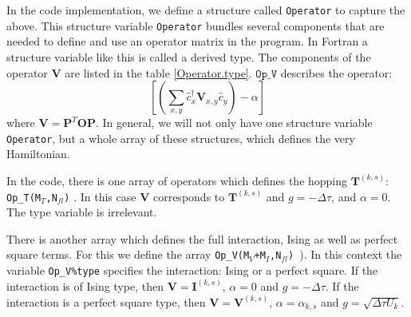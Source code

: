 In the code implementation, we define a structure called \texttt{Operator} to capture the above. 
This structure variable \texttt{Operator} bundles several components that are needed to define and use an operator matrix in the program.
In Fortran a structure variable like this is called a derived type. 
The components of the operator $\bm{V} $ are listed in  the table \ref{Operator.type}.   $ \texttt{Op\_V} $  describes the operator:
\begin{equation}
             \left[ \left( \sum_{x,y} \hat{c}^{\dagger}_x \bm{V}_{x,y} \hat{c}^{\phantom{\dagger}}_{y}  \right) - \alpha \right]  
\end{equation}
where $ \bm{V} = \bm{P}^{T} \bm{O} \bm{P}$.  In general, we will not only have one structure variable \texttt{Operator}, but a whole  array of these structures, which defines the very Hamiltonian. 

In the code, there is one array of operators which defines the hopping $\pmb{T}^{(k,s)} $:  \texttt{Op\_T(M$_T$,N$_{fl}$)} .  In this case $\bm{V}$ corresponds to $\bm{T}^{(k,s)}$ and $g=-\Delta \tau$, 
and $\alpha = 0$.  The type variable is irrelevant. 

  There is another array   which defines the full interaction,  Ising as well as perfect square terms. For this  we define  the array \texttt{Op\_V(M$_V$+M$_I$,N$_{fl}$) }). In this context the variable \texttt{Op\_V\%type} specifies the interaction: Ising or  a perfect square.  If the interaction is of Ising type, then  $\bm{V}  = \bm{I}^{(k,s)} $, $\alpha = 0$ and $g = -\Delta \tau$.  
  If the interaction is a perfect square type, then  $\bm{V}  = \bm{V}^{(k,s)} $, $\alpha = \alpha_{k,s}$ and $g = \sqrt{\Delta \tau  U_k}$.  





